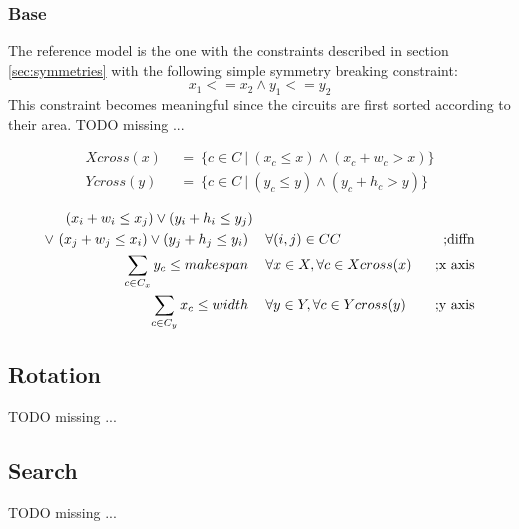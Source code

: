     \subsubsection{Base}
        The reference model is the one with the constraints described in section \ref{sec:symmetries}
        with the following simple symmetry breaking constraint:
        \begin{equation}
            x_1 <= x_2 \land y_1 <= y_2
        \end{equation}
        This constraint becomes meaningful since the circuits are first sorted according to their area.
    \colorbox{BurntOrange}{TODO missing ...}

    \begin{align*}
        Xcross(x)\ &\ =\ \{ c \in C\ |\ (x_c \leq x) \land (x_c + w_c > x) \} \\
        Ycross(y)\ &\ =\ \{ c \in C\ |\ (y_c \leq y) \land (y_c + h_c > y) \} 
    \end{align*}

    \begin{align}
        (x_i + w_i \leq x_j) \lor (y_i + h_i \leq y_j) &\ \ &\ \nonumber \\
        \lor\ (x_j + w_j \leq x_i) \lor (y_j + h_j \leq y_i)\ &\                \hspace{0.2cm} \forall (i,j) \in CC &\ \text{;diffn} \\
                                                                        \sum_{c \in C_x} y_c \leq makespan\ &\ \hspace{0.2cm} \forall x \in X, \forall c \in Xcross(x)\ &\ \text{;x axis} \\
                                                                           \sum_{c \in C_y} x_c \leq width\ &\ \hspace{0.2cm} \forall y \in Y, \forall c \in Ycross(y)\ &\ \text{;y axis}
    \end{align}


\subsection{Rotation}
    \colorbox{BurntOrange}{TODO missing ...}


\subsection{Search}
    \colorbox{BurntOrange}{TODO missing ...}

